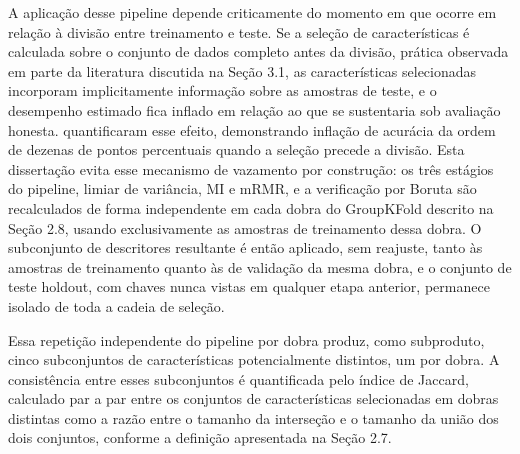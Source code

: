 A aplicação desse pipeline depende criticamente do momento em que ocorre em relação à divisão entre treinamento e teste. Se a seleção de características é calculada sobre o conjunto de dados completo antes da divisão, prática observada em parte da literatura discutida na Seção 3.1, as características selecionadas incorporam implicitamente informação sobre as amostras de teste, e o desempenho estimado fica inflado em relação ao que se sustentaria sob avaliação honesta.  quantificaram esse efeito, demonstrando inflação de acurácia da ordem de dezenas de pontos percentuais quando a seleção precede a divisão. Esta dissertação evita esse mecanismo de vazamento por construção: os três estágios do pipeline, limiar de variância, MI e mRMR, e a verificação por Boruta são recalculados de forma independente em cada dobra do GroupKFold descrito na Seção 2.8, usando exclusivamente as amostras de treinamento dessa dobra. O subconjunto de descritores resultante é então aplicado, sem reajuste, tanto às amostras de treinamento quanto às de validação da mesma dobra, e o conjunto de teste holdout, com chaves nunca vistas em qualquer etapa anterior, permanece isolado de toda a cadeia de seleção.

Essa repetição independente do pipeline por dobra produz, como subproduto, cinco subconjuntos de características potencialmente distintos, um por dobra. A consistência entre esses subconjuntos é quantificada pelo índice de Jaccard, calculado par a par entre os conjuntos de características selecionadas em dobras distintas como a razão entre o tamanho da interseção e o tamanho da união dos dois conjuntos, conforme a definição apresentada na Seção 2.7.










